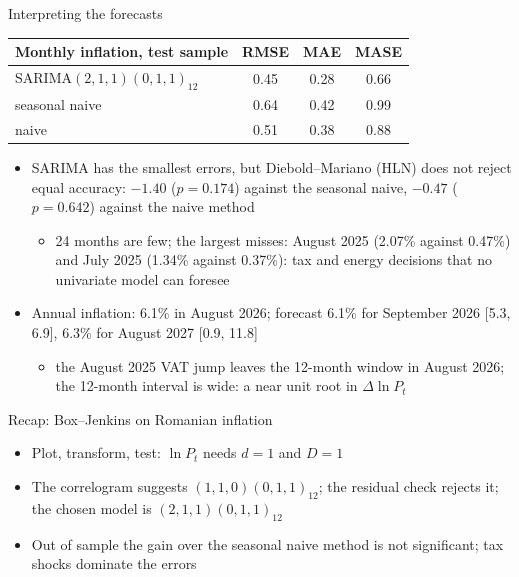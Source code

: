 \begin{frame}{Interpreting the forecasts}
\itemsize{\footnotesize}
\begin{center}
\footnotesize
\begin{tabular}{lccc}
\toprule
\textbf{Monthly inflation, test sample} & RMSE & MAE & MASE \\
\midrule
SARIMA$(2,1,1)(0,1,1)_{12}$ & 0.45 & 0.28 & 0.66 \\
seasonal naive & 0.64 & 0.42 & 0.99 \\
naive & 0.51 & 0.38 & 0.88 \\
\bottomrule
\end{tabular}
\end{center}
\begin{itemize}
    \item SARIMA has the smallest errors, but Diebold--Mariano (HLN) does not reject equal accuracy: $\ensuremath{-}1.40$ ($p = 0.174$) against the seasonal naive, $\ensuremath{-}0.47$ ($p = 0.642$) against the naive method
    \begin{itemize}
        \item 24 months are few; the largest misses: August 2025 (2.07\% against 0.47\%) and July 2025 (1.34\% against 0.37\%): tax and energy decisions that no univariate model can foresee
    \end{itemize}
    \item Annual inflation: 6.1\% in August 2026; forecast 6.1\% for September 2026 [5.3, 6.9], 6.3\% for August 2027 [0.9, 11.8]
    \begin{itemize}
        \item the August 2025 VAT jump leaves the 12-month window in August 2026; the 12-month interval is wide: a near unit root in $\Delta\ln P_t$
    \end{itemize}
\end{itemize}
\end{frame}

\begin{frame}{Recap: Box--Jenkins on Romanian inflation}
\itemsize{\small}
\begin{itemize}
    \item Plot, transform, test: $\ln P_t$ needs $d = 1$ and $D = 1$
    \item The correlogram suggests $(1,1,0)(0,1,1)_{12}$; the residual check rejects it; the chosen model is $(2,1,1)(0,1,1)_{12}$
    \item Out of sample the gain over the seasonal naive method is not significant; tax shocks dominate the errors
\end{itemize}
\end{frame}


